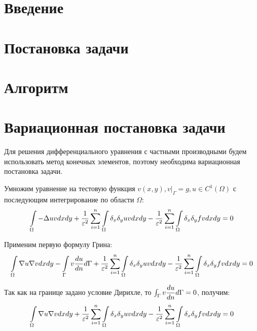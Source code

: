 \documentclass[14pt, a4paper]{extarticle}
\begin{document}
	
	\pagebreak
	
	\section{Введение}
	\section{Постановка задачи}
	\section{Алгоритм}
	\section{Вариационная постановка задачи}
		Для решения дифференциального уравнения с частными производными будем использовать метод конечных элементов, поэтому необходима вариационная постановка задачи.
		
		Умножим уравнение на тестовую функция \(v(x, y), v\rvert_\Gamma = g, u\in C^1(\Omega)\) с последующим интегрирование по области $\Omega$:
		\[ \int\displaylimits_{\Omega}-\Delta uvdxdy + 
		\dfrac{1}{\varepsilon^2}\sum_{i=1}^{n}\int\displaylimits_{\Omega}\delta_x\delta_yuvdxdy -
		\dfrac{1}{\varepsilon^2}\sum_{i=1}^{n}\int\displaylimits_{\Omega}\delta_x\delta_yfvdxdy = 0 \]
		
		Применим первую формулу Грина:
		\[ \int\displaylimits_{\Omega}\nabla u\nabla v dxdy - \int\displaylimits_{\Gamma}v\dfrac{du}{dn}d\Gamma +
		\dfrac{1}{\varepsilon^2}\sum_{i=1}^{n}\int\displaylimits_{\Omega}\delta_x\delta_yuvdxdy -
		\dfrac{1}{\varepsilon^2}\sum_{i=1}^{n}\int\displaylimits_{\Omega}\delta_x\delta_yfvdxdy = 0 \]
		
		Так как на границе задано условие Дирихле, то \( \int\displaylimits_{\Gamma}v\dfrac{du}{dn}d\Gamma = 0 \), получим:
		\[ \int\displaylimits_{\Omega}\nabla u\nabla v dxdy +
		\dfrac{1}{\varepsilon^2}\sum_{i=1}^{n}\int\displaylimits_{\Omega}\delta_x\delta_yuvdxdy -
		\dfrac{1}{\varepsilon^2}\sum_{i=1}^{n}\int\displaylimits_{\Omega}\delta_x\delta_yfvdxdy = 0 \]
\end{document}
